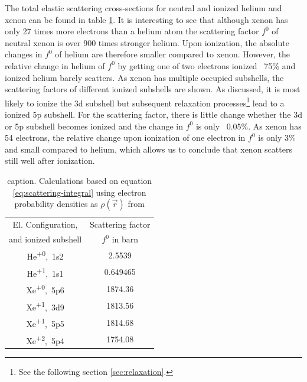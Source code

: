 The total elastic scattering cross-sections for neutral and ionized helium and xenon can be found in table \ref{tab:helium-xenon-el-scattering-crossection}. It is interesting to see that although xenon has only 27 times more electrons than a helium atom the scattering factor $f^{0}$ of neutral xenon is over 900 times stronger helium. Upon ionization, the absolute changes in $f^{0}$ of helium are therefore smaller compared to xenon. However, the relative change in helium of $f^{0}$ by getting one of two electrons ionized ~75\% and ionized helium barely scatters. As xenon has multiple occupied subshells, the scattering factors of different ionized subshells are shown. As discussed, it is most likely to ionize the 3d subshell but subsequent relaxation processes\footnote{See the following section \ref{sec:relaxation}.} lead to a ionized 5p subshell. For the scattering factor, there is little change whether the 3d or 5p subshell becomes ionized and the change in $f^{0}$ is only ~0.05\%. As xenon has 54 electrons, the relative change upon ionization of one electron in $f^{0}$ is only 3\% and small compared to helium, which allows us to conclude that xenon scatters still well after ionization.  
\begin{table}
	\centering
		\begin{tabular}{ | c | c | }
		\hline
			El. Configuration, & Scattering factor \\
			and ionized subshell & $f^{0}$ in barn \\ \hline
			He\textsuperscript{+0},\ 1s2 & 2.5539  \\ \hline
			He\textsuperscript{+1},\ 1s1 & 0.649465  \\ \hline
			Xe\textsuperscript{+0},\ 5p6 & 1874.36  \\ \hline
			Xe\textsuperscript{+1},\ 3d9 & 1813.56  \\ \hline
			Xe\textsuperscript{+1},\ 5p5 & 1814.68  \\ \hline
			Xe\textsuperscript{+2},\ 5p4 & 1754.08  \\ \hline
		\end{tabular}
	\caption{caption. Calculations based on equation \eqref{eq:scattering-integral} using electron probability densities as $\rho(\vec{r})$ from \cite{Ho-2016-PC}}
	\label{tab:helium-xenon-el-scattering-crossection}
\end{table}
